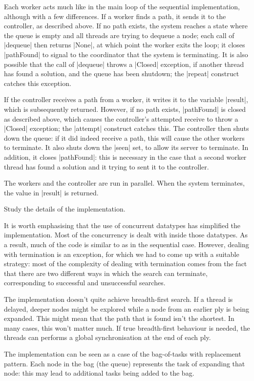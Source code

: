 
Each worker acts much like in the main loop of the sequential implementation,
although with a few differences.  If a worker finds a path, it sends it to the
controller, as described above.  If no path exists, the system reaches a state
where the queue is empty and all threads are trying to dequeue a node; each
call of |dequeue| then returns |None|, at which point the worker exits the
loop; it closes |pathFound| to signal to the coordinator that the system is
terminating.  It is also possible that the call of |dequeue| throws a |Closed|
exception, if another thread has found a solution, and the queue has been
shutdown; the |repeat| construct catches this exception.

If the controller receives a path from a worker, it writes it to the variable
|result|, which is subsequently returned.  However, if no path exists,
|pathFound| is closed as described above, which causes the controller's
attempted receive to throw a |Closed| exception; the |attempt| construct
catches this.  The controller then shuts down the queue: if it did indeed
receive a path, this will cause the other workers to terminate.  It also shuts
down the |seen| set, to allow its server to terminate.  In addition, it closes
|pathFound|: this is necessary in the case that a second worker thread has
found a solution and it trying to sent it to the controller.

The workers and the controller are run in parallel.  When the system
terminates, the value in |result| is returned.

\begin{instruction}
Study the details of the implementation.
\end{instruction}

It is worth emphasising that the use of concurrent datatypes has simplified
the implementation.  Most of the concurrency is dealt with inside those
datatypes.  As a result, much of the code is similar to as in the sequential
case.  However, dealing with termination is an exception, for which we had to
come up with a suitable strategy: most of the complexity of dealing with
termination comes from the fact that there are two different ways
in which the search can terminate, corresponding to successful and
unsuccessful searches. 

The implementation doesn't quite achieve breadth-first search.  If a thread is
delayed, deeper nodes might be explored while a node from an earlier ply is
being expanded.  This might mean that the path that is found isn't the
shortest.  In many cases, this won't matter much.  If true breadth-first
behaviour is needed, the threads can performs a global synchronisation at the
end of each ply.

The implementation can be seen as a case of the bag-of-tasks with replacement
pattern.  Each node in the bag (the queue) represents the task of expanding
that node: this may lead to additional tasks being added to the bag.

